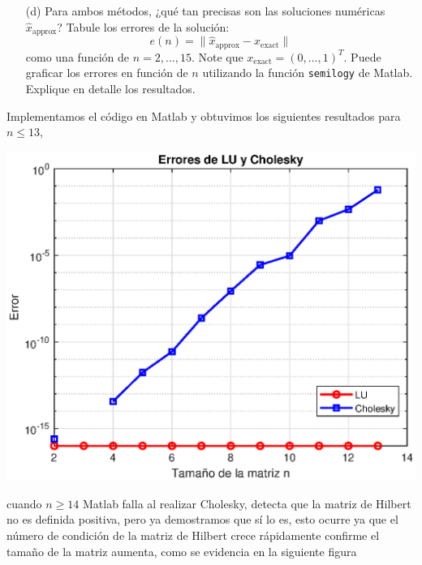 \begin{enumerate}
    \item[(d)] Para ambos métodos, ¿qué tan precisas son las soluciones numéricas $\hat{x}_{\text{approx}}$? Tabule los errores de la solución:
    \[
    e(n) = \|\hat{x}_{\text{approx}} - x_{\text{exact}}\|
    \]
    como una función de $n = 2, \ldots, 15$. Note que $x_{\text{exact}} = (0, \ldots, 1)^T$. Puede graficar los errores en función de $n$ utilizando la función \texttt{semilogy} de Matlab. Explique en detalle los resultados.
\end{enumerate}

\begin{solution}
Implementamos el código en Matlab y obtuvimos los siguientes resultados para \\$n\leq 13$,

\begin{center}
    \includegraphics[scale=0.7]{Graficas/tarea_2_coya.eps}
\end{center}

cuando $n \geq 14$ Matlab falla al realizar Cholesky, detecta que la matriz de Hilbert no es definida positiva, pero ya demostramos que sí lo es, esto ocurre ya que el número de condición de la matriz de Hilbert crece  rápidamente confirme el tamaño de la matriz aumenta, como se evidencia en la siguiente figura


\end{solution}
